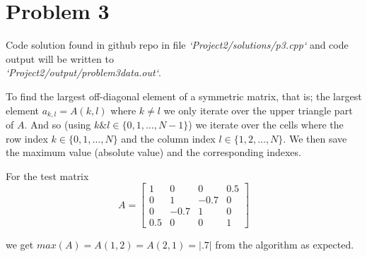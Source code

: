 \documentclass[final, 3p, times, 11.5pt]{article}
\begin{document}
\section{Problem 3}

Code solution found in github repo in file \textit{`Project2/solutions/p3.cpp`} and code output will be written to \\ \textit{`Project2/output/problem3data.out`}. 

To find the largest off-diagonal element of a symmetric matrix, that is; the largest element $a_{k, l} = A(k,l)$ where $k\neq l$ we only iterate over the upper triangle part of $A$. And so (using $k \& l \in \{0, 1, \dots, N-1\}$) we iterate over the cells where the row index $k \in \{0, 1, \dots, N\}$ and the column index $l \in \{1, 2, \dots, N\}$. We then save the maximum value (absolute value) and the corresponding indexes. 

For the test matrix 
$$
A = 
\begin{bmatrix}
1 & 0 & 0 & 0.5\\
0 & 1 & -0.7 & 0\\
0 & -0.7 & 1 & 0\\
0.5 & 0 & 0 & 1
\end{bmatrix}
$$

we get $max(A) = A(1, 2) = A(2,1) = |.7|$ from the algorithm as expected. 
\end{document}

